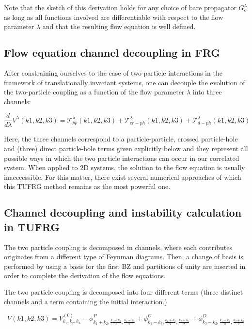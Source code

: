 \documentclass[12pt]{article}
\begin{document}
Note that the sketch of this derivation holds for any choice of bare propagator $G_o^{\lambda}$ as long as all functions involved are differentiable with respect to the flow parameter $\lambda$ and that the resulting flow equation is well defined. 

\subsection{ Flow equation channel decoupling in FRG }

After constraining ourselves to the case of two-particle interactions in the framework of translationally invariant systems, one can decouple  the evolution of the two-particle coupling as a function of the flow parameter $\lambda$ into three channels:

\begin{equation}\label{3 channels}
    \frac{d}{d\lambda} V^{\lambda}(k1, k2, k3) = \mathcal{T}_{pp}^{\lambda}(k1,k2,k3) + \mathcal{T}_{cr-ph}^{\lambda}(k1,k2,k3) +\mathcal{T}_{d-ph}^{\lambda}(k1,k2,k3)
\end{equation}

Here, the three channels correspond to a particle-particle, crossed particle-hole and (three) direct particle-hole terms given explicitly below and they represent all possible ways in which the two particle interactions can occur in our correlated system. When applied to 2D systems, the solution to the flow equation is usually inacecessible. For this matter, there exist several numerical approaches of which this TUFRG method remains as the most powerful one.


\subsection{ Channel decoupling and instability calculation in TUFRG}

The two particle coupling is decomposed in channels, where each contributes originates from a different type of Feynman diagrams. Then, a change of basis is performed by using a basis for the first BZ and partitions of unity are inserted in order to complete the derivation of the flow equations.

The two particle coupling is decomposed into four different terms (three distinct channels and a term containing the initial interaction.)

\begin{equation} \label{V decoupling}
    V(k1,k2,k3)= V_{k_1, k_2, k_3}^{(0)} - \phi^{P}_{k_1 +k_2, \frac{k_1 - k_2}{2}, \frac{k_4-k_3}{2}} + \phi^{C}_{k_1 - k_3, \frac{k_1 +k_3}{2}, \frac{k_2+k_4}{2}} +\phi^{D}_{k_3- k_2, \frac{k_1 + k_4}{2}, \frac{k_2+k_3}{2}}
\end{equation}
\end{document}
